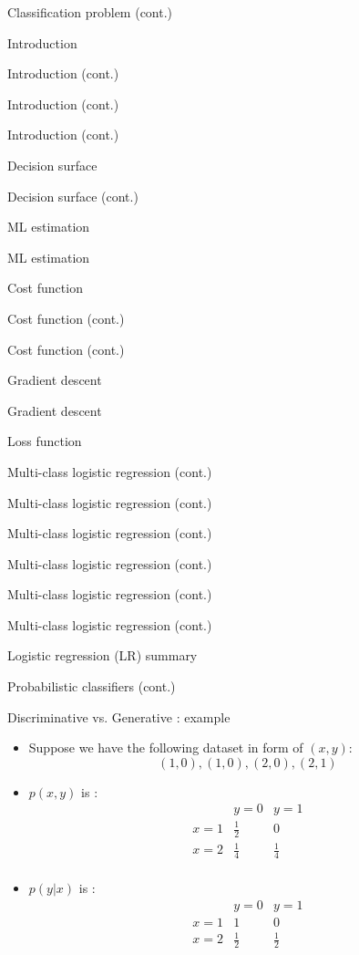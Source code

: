 \documentclass[serif, aspectratio=169]{beamer}
\begin{document}
\begin{frame}{Classification problem (cont.)}
\begin{itemize}
\begin{frame}{Introduction}
\begin{itemize}
\begin{frame}{Introduction (cont.)}
\begin{frame}{Introduction (cont.)}
\begin{frame}{Introduction (cont.)}
\begin{frame}{Decision surface}
\begin{itemize}
\begin{frame}{Decision surface (cont.)}
\begin{frame}{ML estimation}
\begin{frame}{ML estimation}
\begin{itemize}
\begin{frame}{Cost function}
\begin{frame}{Cost function (cont.)}
\begin{itemize}
\begin{itemize}
\begin{frame}{Cost function (cont.)}
\begin{frame}{Gradient descent}
\begin{frame}{Gradient descent}
\begin{frame}{Loss function}
\begin{frame}{Multi-class logistic regression (cont.)}
\begin{frame}{Multi-class logistic regression (cont.)}
\begin{frame}{Multi-class logistic regression (cont.)}
\begin{frame}{Multi-class logistic regression (cont.)}
\begin{frame}{Multi-class logistic regression (cont.)}
\begin{frame}{Multi-class logistic regression (cont.)}
\begin{frame}{Logistic regression (LR) summary}
\begin{itemize}
\begin{frame}{Probabilistic classifiers (cont.)}
\begin{itemize}
    \end{itemize}
\end{frame}

\begin{frame}{Discriminative vs. Generative : example}
    \begin{itemize}
        \item Suppose we have the following dataset in form of $(x, y)$:
            \[
                (1,0), (1,0), (2,0), (2,1)
            \]
        \item $p(x,y)$ is :
            \[
            \begin{array}{c|cc}
                & y=0 & y=1 \\
                \hline
            x=1 & \frac{1}{2} & 0 \\
            x=2 & \frac{1}{4} & \frac{1}{4} \\
            \end{array}
            \]
        \item $p(y|x)$ is :
            \[
            \begin{array}{c|cc}
                & y=0 & y=1 \\
                \hline
            x=1 & 1 & 0 \\
            x=2 & \frac{1}{2} & \frac{1}{2} \\
            \end{array}
            \]
    \end{itemize}
\end{frame}



\end{itemize}
\end{frame}
\end{frame}
\end{frame}
\end{frame}
\end{frame}
\end{frame}
\end{frame}
\end{frame}
\end{frame}
\end{frame}
\end{frame}
\end{itemize}
\end{itemize}
\end{frame}
\end{frame}
\end{itemize}
\end{frame}
\end{frame}
\end{frame}
\end{itemize}
\end{frame}
\end{frame}
\end{frame}
\end{frame}
\end{itemize}
\end{frame}
\end{itemize}
\end{frame}
\end{document}
